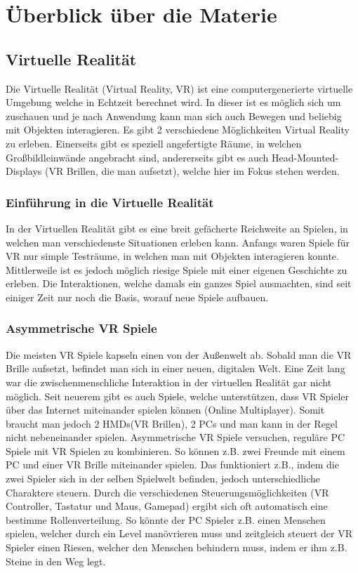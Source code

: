 \chapter{Überblick über die Materie}
\section{Virtuelle Realität}
Die Virtuelle Realität (Virtual Reality, VR) ist eine computergenerierte virtuelle Umgebung welche in Echtzeit berechnet wird. In dieser ist es möglich sich um zuschauen und je nach Anwendung kann man sich auch Bewegen und beliebig mit Objekten interagieren. Es gibt 2 verschiedene Möglichkeiten Virtual Reality zu erleben. Einerseits gibt es speziell angefertigte Räume, in welchen Großbildleinwände angebracht sind, andererseits gibt es auch Head-Mounted-Displays (VR Brillen,  die man aufsetzt), welche hier im Fokus stehen werden.


\subsection{Einführung in die Virtuelle Realität}
In der Virtuellen Realität gibt es eine breit gefächerte Reichweite an Spielen, in welchen man verschiedenste Situationen erleben kann. Anfangs waren Spiele für VR nur simple Testräume, in welchen man mit Objekten interagieren konnte. Mittlerweile ist es jedoch möglich riesige Spiele mit einer eigenen Geschichte zu erleben. Die Interaktionen, welche damals ein ganzes Spiel ausmachten, sind seit einiger Zeit nur noch die Basis, worauf neue Spiele aufbauen.

\subsection{Asymmetrische VR Spiele}
Die meisten VR Spiele kapseln einen von der Außenwelt ab. Sobald man die VR Brille aufsetzt, befindet man sich in einer neuen, digitalen Welt. Eine Zeit lang war die zwischenmenschliche Interaktion in der virtuellen Realität gar nicht möglich. Seit neuerem gibt es auch Spiele, welche  unterstützen, dass VR Spieler über das Internet miteinander spielen können (Online Multiplayer). Somit braucht man jedoch 2 HMDs(VR Brillen), 2 PCs und man kann in der Regel nicht nebeneinander spielen. Asymmetrische VR Spiele versuchen, reguläre PC Spiele mit VR Spielen zu kombinieren. So können z.B. zwei Freunde mit einem PC und einer VR Brille miteinander spielen. Das funktioniert z.B., indem die zwei Spieler sich in der selben Spielwelt befinden, jedoch unterschiedliche Charaktere steuern. Durch die verschiedenen Steuerungsmöglichkeiten (VR Controller, Tastatur und Maus, Gamepad) ergibt sich oft automatisch eine bestimme Rollenverteilung. So könnte der PC Spieler z.B. einen Menschen spielen, welcher durch ein Level manövrieren muss und zeitgleich steuert der VR Spieler einen Riesen, welcher den Menschen behindern muss, indem er ihm z.B. Steine in den Weg legt.  


